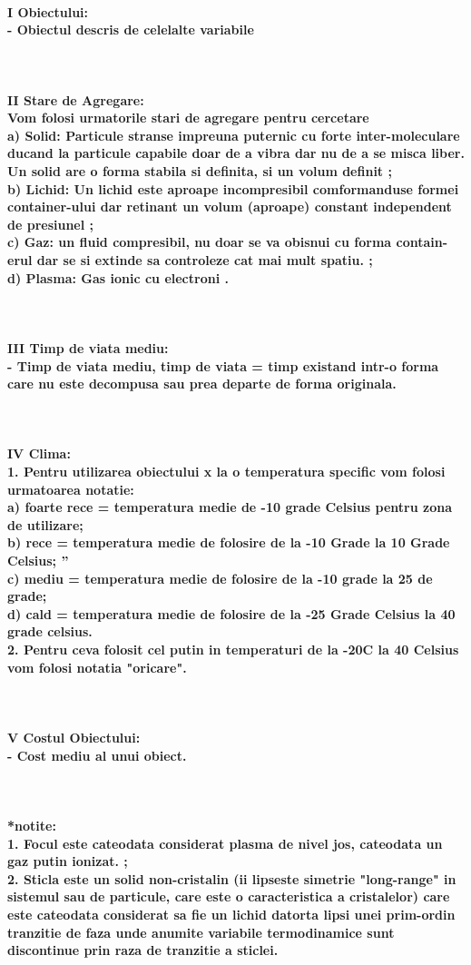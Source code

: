 \documentclass[12px]{article}
\newcommand{\aparagraph}[1]{\paragraph{#1}\mbox{}\\}
\begin{document}
\aparagraph{I Obiectului: \\
- Obiectul descris de celelalte variabile}
\aparagraph{II Stare de Agregare: \\
Vom folosi urmatorile stari de agregare pentru cercetare \\
   a) Solid: Particule stranse impreuna puternic cu forte inter-moleculare ducand la particule capabile doar de a vibra dar nu de a se misca liber. Un solid are o forma stabila si definita, si un volum definit \parencite{solids}; \\
   b) Lichid: Un lichid este aproape incompresibil comformanduse formei container-ului dar retinant un volum (aproape) constant independent de presiunel \parencite{liquids}; \\
   c) Gaz: un fluid compresibil, nu doar se va obisnui cu forma contain-erul dar se si extinde sa controleze cat mai mult spatiu. \parencite{gases} ; \\
   d) Plasma: Gas ionic cu electroni \parencite{plasma}. }
\aparagraph{III Timp de viata mediu: \\
   - Timp de viata mediu, timp de viata = timp existand intr-o forma care nu este decompusa sau prea departe de forma originala.}
\aparagraph{IV Clima: \\
1. Pentru utilizarea obiectului x la o temperatura specific vom folosi urmatoarea notatie: \\
   a) foarte rece = temperatura medie de -10 grade Celsius pentru zona de utilizare; \\
   b) rece = temperatura medie de folosire de la -10 Grade la 10 Grade Celsius; '' \\
   c) mediu = temperatura medie de folosire de la -10 grade la 25 de grade; \\
   d) cald = temperatura medie de folosire de la -25 Grade Celsius la 40 grade celsius. \\
2. Pentru ceva folosit cel putin in temperaturi de la -20C la 40 Celsius vom folosi notatia "oricare".}
\aparagraph{V Costul Obiectului:  \\
   - Cost mediu al unui obiect.}
\aparagraph{*notite: \\
 1. Focul este cateodata considerat plasma de nivel jos, cateodata un gaz putin ionizat. \parencite{firedef}; \\
 2. Sticla este un solid non-cristalin (ii lipseste simetrie "long-range" in sistemul sau de particule, care este o caracteristica a cristalelor) care este cateodata considerat sa fie un lichid datorta lipsi unei prim-ordin tranzitie de faza unde anumite variabile termodinamice sunt discontinue prin raza de tranzitie a sticlei. \parencite {glassdef} }

\printbibliography
\end{document}
